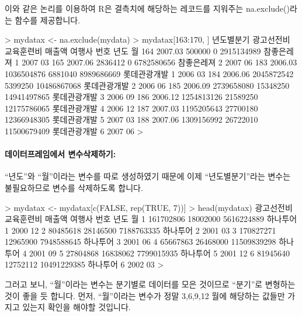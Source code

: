 \documentclass[tutorial.tex]{subfiles}
\begin{document}
이와 같은 논리를 이용하여 R은 결측치에 해당하는 레코드를 지워주는 na.exclude()라는 함수를 제공합니다. 

\begin{Schunk}
\begin{Soutput}
> mydatax <- na.exclude(mydata)
> mydatax[163:170, ]
    년도별분기 광고선전비 교육훈련비      매출액       여행사 번호 년도 월
164    2007.03     500000          0  2915134989   참좋은레져    1 2007 03
165    2007.06    2836412          0  6782580656   참좋은레져    2 2007 06
183    2006.03 1036504876    6881040  8989686669 롯데관광개발    1 2006 03
184    2006.06 2045872542    5399250 10486867068 롯데관광개발    2 2006 06
185    2006.09 2739658080   15348250 14941497865 롯데관광개발    3 2006 09
186    2006.12 1254813126   21589250 12175786065 롯데관광개발    4 2006 12
187    2007.03 1195205643   27700180 12366948305 롯데관광개발    5 2007 03
188    2007.06 1309156992   26722010 11500679409 롯데관광개발    6 2007 06
> 
\end{Soutput}
\end{Schunk}

\paragraph{데이터프레임에서 변수삭제하기:}
``년도''와 ``월''이라는 변수를 따로 생성하였기 때문에 이제 ``년도별분기''라는 변수는 불필요하므로 변수를 삭제하도록 합니다.

\begin{Schunk}
\begin{Soutput}
> mydatax <- mydatax[c(FALSE, rep(TRUE, 7))]
> head(mydatax)
  광고선전비 교육훈련비      매출액   여행사 번호 년도 월
1  161702806   18002000  5616224889 하나투어    1 2000 12
2   80485618   28146500  7188763335 하나투어    2 2001 03
3  170827271   12965900  7948588645 하나투어    3 2001 06
4   65667863   26468000 11509839298 하나투어    4 2001 09
5   27804868   16838062  7799015935 하나투어    5 2001 12
6   81945640   12752112 10491229385 하나투어    6 2002 03
> 
\end{Soutput}
\end{Schunk}
 
그러고 보니, ``월''이라는 변수는 분기별로 데이터를 모은 것이므로 ``분기''로 변형하는 것이 좋을 듯 합니다.
먼저, ``월''이라는 변수가 정말 3,6,9,12 월에 해당하는 값들만 가지고 있는지 확인을 해야할 것입니다.

\begin{Schunk}
\end{Schunk}
\end{document}
